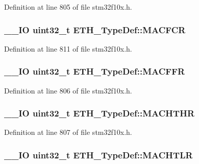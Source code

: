 Definition at line 805 of file stm32f10x.\-h.

\hypertarget{struct_e_t_h___type_def_acdbe493d9d68ddfed4c758f0a7bde058}{
\subsubsection[{M\-A\-C\-F\-C\-R}]{\setlength{\rightskip}{0pt plus 5cm}\-\_\-\-\_\-\-I\-O {\bf uint32\-\_\-t} E\-T\-H\-\_\-\-Type\-Def\-::\-M\-A\-C\-F\-C\-R}}\label{struct_e_t_h___type_def_acdbe493d9d68ddfed4c758f0a7bde058}


Definition at line 811 of file stm32f10x.\-h.

\hypertarget{struct_e_t_h___type_def_afdf573860dd5dcd13f2b6b19dcb92cc1}{
\subsubsection[{M\-A\-C\-F\-F\-R}]{\setlength{\rightskip}{0pt plus 5cm}\-\_\-\-\_\-\-I\-O {\bf uint32\-\_\-t} E\-T\-H\-\_\-\-Type\-Def\-::\-M\-A\-C\-F\-F\-R}}\label{struct_e_t_h___type_def_afdf573860dd5dcd13f2b6b19dcb92cc1}


Definition at line 806 of file stm32f10x.\-h.

\hypertarget{struct_e_t_h___type_def_ace541cc94118ec2db7c930a44960aa18}{
\subsubsection[{M\-A\-C\-H\-T\-H\-R}]{\setlength{\rightskip}{0pt plus 5cm}\-\_\-\-\_\-\-I\-O {\bf uint32\-\_\-t} E\-T\-H\-\_\-\-Type\-Def\-::\-M\-A\-C\-H\-T\-H\-R}}\label{struct_e_t_h___type_def_ace541cc94118ec2db7c930a44960aa18}


Definition at line 807 of file stm32f10x.\-h.

\hypertarget{struct_e_t_h___type_def_a22bd30c653a4c1c8f46a59e0a821dcf8}{
\subsubsection[{M\-A\-C\-H\-T\-L\-R}]{\setlength{\rightskip}{0pt plus 5cm}\-\_\-\-\_\-\-I\-O {\bf uint32\-\_\-t} E\-T\-H\-\_\-\-Type\-Def\-::\-M\-A\-C\-H\-T\-L\-R}}\label{struct_e_t_h___type_def_a22bd30c653a4c1c8f46a59e0a821dcf8}


